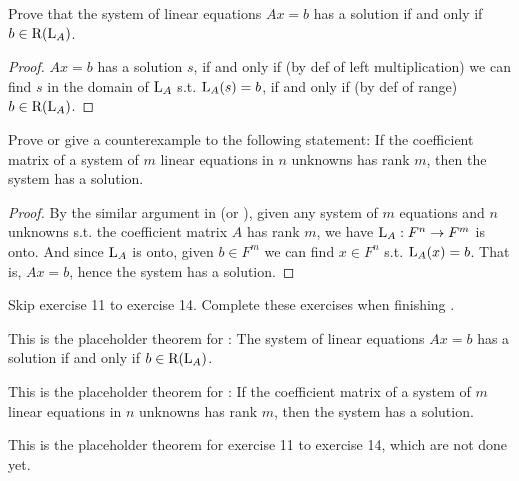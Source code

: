 \begin{exercise} \label{exercise 3.3.9}
Prove that the system of linear equations \(Ax = b\) has a solution if and only if \(b \in \mathrm{R}(\mathrm{L}_A)\).
\end{exercise}

\begin{proof}
\(Ax = b\) has a solution \(s\), if and only if (by def of left multiplication) we can find \(s\) in the domain of \(\mathrm{L}_A\) s.t. \(\mathrm{L}_A(s) = b\), if and only if (by def of range) \(b \in \mathrm{R}(\mathrm{L}_A)\).
\end{proof}

\begin{exercise} \label{exercise 3.3.10}
Prove or give a counterexample to the following statement:
If the coefficient matrix of a system of \(m\) linear equations in \(n\) unknowns has rank \(m\), then the system has a solution.
\end{exercise}

\begin{proof}
By the similar argument in (or ), given any system of \(m\) equations and \(n\) unknowns s.t. the coefficient matrix \(A\) has rank \(m\), we have \(\mathrm{L}_A : F^n \to F^m\) is onto.
And since \(\mathrm{L}_A\) is onto, given \(b \in F^m\) we can find \(x \in F^n\) s.t. \(\mathrm{L}_A(x) = b\).
That is, \(Ax = b\), hence the system has a solution.
\end{proof}

\TODOREF{} Skip exercise 11 to exercise 14.
Complete these exercises when finishing .

\begin{additional theorem} \label{athm 3.13}
This is the placeholder theorem for : The system of linear equations \(Ax = b\) has a solution if and only if \(b \in \mathrm{R}(\mathrm{L}_A)\).
\end{additional theorem}

\begin{additional theorem} \label{athm 3.14}
This is the placeholder theorem for :
If the coefficient matrix of a system of \(m\) linear equations in \(n\) unknowns has rank \(m\), then the system has a solution.
\end{additional theorem}

\begin{additional theorem} \label{athm 3.15}
This is the placeholder theorem for exercise 11 to exercise 14, which are not done yet.
\end{additional theorem}
